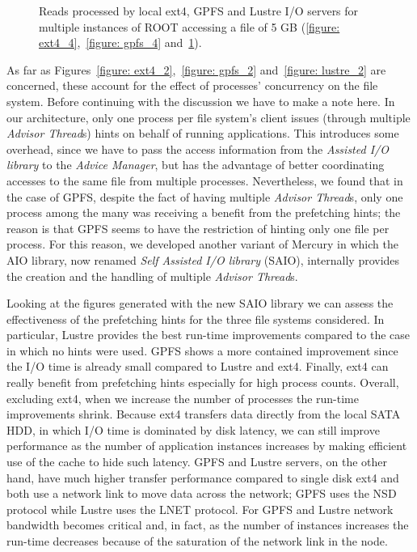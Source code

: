 \begin{figure}[]
\begin{subfigure}[]{0.70\textwidth}
    \caption{\textit{}}
    \label{figure: lustre_4}
  \end{subfigure}
  \caption{Reads processed by local ext4, GPFS and Lustre I/O servers for multiple instances of ROOT accessing a file of 5 GB (\ref{figure: ext4_4},~\ref{figure: gpfs_4} and~\ref{figure: lustre_4}).}
  \label{figure: read_2}
\end{figure}

As far as Figures~\ref{figure: ext4_2},~\ref{figure: gpfs_2} and~\ref{figure: lustre_2} are concerned, these account for the effect of processes' concurrency on the file system. 
Before continuing with the discussion we have to make a note here. In our architecture, only one process per file system's client issues (through multiple \textit{Advisor Thread}s) 
hints on behalf of running applications. This introduces some overhead, since we have to pass the access information from the \textit{Assisted I/O library} to the \textit{Advice Manager}, 
but has the advantage of better coordinating accesses to the same file from multiple processes. Nevertheless, we found that in the case of GPFS, despite the fact of having multiple 
\textit{Advisor Thread}s, only one process among the many was receiving a benefit from the prefetching hints; the reason is that GPFS seems to have the restriction of hinting only one 
file per process. For this reason, we developed another variant of Mercury in which the AIO library, now renamed \textit{Self Assisted I/O library} (SAIO), internally provides the 
creation and the handling of multiple \textit{Advisor Thread}s. 

Looking at the figures generated with the new SAIO library we can assess the effectiveness of the prefetching hints for 
the three file systems considered. In particular, Lustre provides the best run-time improvements compared to the case in which no hints were used. GPFS shows a more contained improvement 
since the I/O time is already small compared to Lustre and ext4. Finally, ext4 can really benefit from prefetching hints especially for high process counts. Overall, excluding ext4, when 
we increase the number of processes the run-time improvements shrink. Because ext4 transfers data directly from the local SATA HDD, in which I/O time is dominated by disk latency, we can 
still improve performance as the number of application instances increases by making efficient use of the cache to hide such latency. GPFS and Lustre servers, on the other hand, have much 
higher transfer performance compared to single disk ext4 and both use a network link to move data across the network; GPFS uses the NSD protocol while Lustre uses the LNET protocol. For GPFS
and Lustre network bandwidth becomes critical and, in fact, as the number of instances increases the run-time decreases because of the saturation of the network link in the node.

